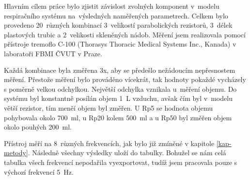 Hlavním cílem práce bylo zjistit závislost zvolných komponent v~modelu respiračního systému na~výsledných naměřených parametrech.  Celkem bylo provedeno 20~různých kombinací 3~velikostí parabolických rezistorů, 3~délek plastových trubic a 2~velikosti skleněných nádob. Měření jsem realizovala pomocí přístroje tremoflo C-100 (Thorasys Thoracic Medical Systems Inc., Kanada) v laboratoři FBMI ČVUT v Praze. 

Každá kombinace byla změřena 3x, aby se předešlo nežádoucím nepřesnostem měření. Přestože měření bylo prováděno vícekrát, tak hodnoty pokaždé vycházely s poměrně velkou odchylkou. Největší odchylka vznikala u~měření objemu. Do systému byl konstantně posílán objem 1~L vzduchu, avšak čím byl v~modelu větší rezistor,  tím meněí objem byl změřen. U Rp5 se hodnota objemu pohybovala okolo 700~ml, u Rp20 kolem 500~ml a u Rp50 byl změřen objem okolo pouhých 200~ml.

Přístroj měří na 8~různých frekvencích, jak bylo již zmíněné v kapitole \ref{kap-metody}. Následně všechny výsledky uloží do tabulky. Bohužel se nám celá tabulka všech frekvencí nepodařila vyexportovat, tudíž jsem pracovala pouze s výchozí frekvencí 5~Hz. 
